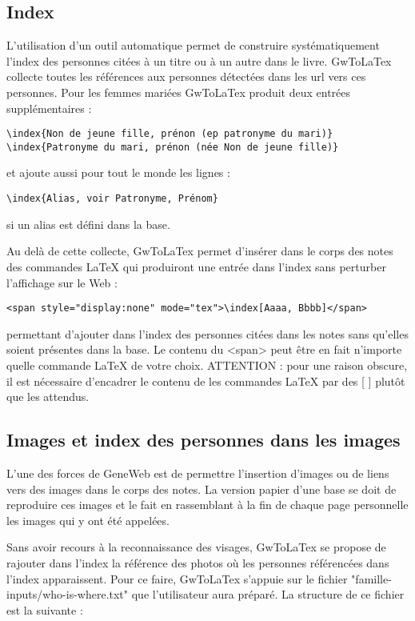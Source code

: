 \subsection{Index}

L'utilisation d'un outil automatique permet de construire systématiquement
l'index des personnes citées à un titre ou à un autre dans le livre.
GwToLaTex collecte toutes les références aux personnes
détectées dans les url vers ces personnes. Pour les femmes mariées
GwToLaTex produit deux entrées supplémentaires :
\begin{verbatim}
\index{Non de jeune fille, prénon (ep patronyme du mari)}
\index{Patronyme du mari, prénon (née Non de jeune fille)}
\end{verbatim}
et ajoute aussi pour tout le monde les lignes :
\begin{verbatim}
\index{Alias, voir Patronyme, Prénom}
\end{verbatim}
si un alias est défini dans la base.

Au delà de cette collecte, GwToLaTex permet d'insérer dans le corps des notes
des commandes LaTeX qui produiront une entrée dans l'index sans perturber
l'affichage sur le Web :
\begin{verbatim}
<span style="display:none" mode="tex">\index[Aaaa, Bbbb]</span>
\end{verbatim}
permettant d'ajouter dans l'index des personnes citées dans les notes
sans qu'elles soient présentes dans la base.
Le contenu du <span> peut être en fait n'importe quelle commande LaTeX de votre choix.
ATTENTION : pour une raison obscure, il est nécessaire d'encadrer le
contenu de les commandes LaTeX par des [ ] plutôt que les { } attendus.

\subsection{Images et index des personnes dans les images}

L'une des forces de GeneWeb est de permettre l'insertion d'images ou de 
liens vers des images dans le corps des notes. La version papier d'une base
se doit de reproduire ces images et le fait en rassemblant à la fin de chaque
page personnelle les images qui y ont été appelées.

Sans avoir recours à la reconnaissance des visages, GwToLaTex se propose de
rajouter dans l'index la référence des photos où les personnes référencées
dans l'index apparaissent. Pour ce faire, GwToLaTex s'appuie sur le fichier
"famille-inputs/who-is-where.txt" que l'utilisateur aura préparé.
La structure de ce fichier est la suivante :

